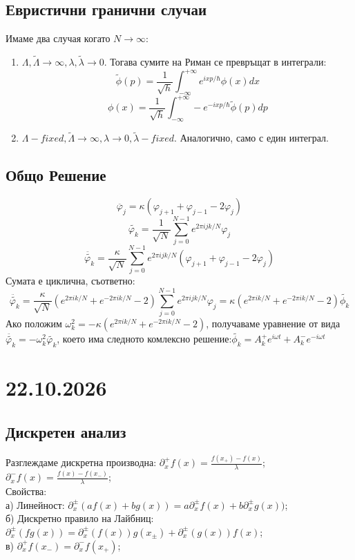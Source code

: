 \documentclass[12pt, a4paper]{article}
\begin{document}
\subsection*{Евристични гранични случаи}
Имаме два случая когато $N\rightarrow\infty$:\\
\begin{enumerate}
	\item $\Lambda, \tilde{\Lambda} \rightarrow \infty, \lambda, \tilde{\lambda} \rightarrow 0.$ Тогава сумите на Риман се превръщат в интеграли:\\
	\[\tilde{\phi}(p)=\frac{1}{\sqrt{h}}\int_{-\infty}^{+\infty}e^{ixp/\hbar}\phi(x)dx\]
	\[\phi(x)=\frac{1}{\sqrt{h}}\int_{-\infty}^{+\infty}-e^{-ixp/\hbar}\tilde{\phi}(p)dp\]
	\item $\Lambda-fixed, \tilde{\Lambda} \rightarrow \infty, \lambda \rightarrow 0, \tilde{\lambda} - fixed.$ Аналогично, само с един интеграл.
\end{enumerate}

\subsection*{Общо Решение}
\[\ddot{\varphi_j}=\kappa(\varphi_{j+1}+\varphi_{j-1}-2\varphi_{j})\]
\[\tilde{\varphi_k}=\frac{1}{\sqrt{N}}\sum_{j=0}^{N-1}e^{2\pi ijk/N}\varphi_j\]
\[\ddot{\tilde{\varphi_k}}=\frac{\kappa}{\sqrt{N}}\sum_{j=0}^{N-1}e^{2\pi ijk/N}(\varphi_{j+1}+\varphi_{j-1}-2\varphi_{j})\]
Сумата е циклична, съответно:
\[\ddot{\tilde{\varphi_k}}=\frac{\kappa}{\sqrt{N}}(e^{2\pi ik/N}+e^{-2\pi ik/N}-2)\sum_{j=0}^{N-1}e^{2\pi ijk/N}\varphi_{j}=\kappa(e^{2\pi ik/N}+e^{-2\pi ik/N}-2)\tilde{\phi_k}\]
Ако положим $\omega_k^2=-\kappa(e^{2\pi ik/N}+e^{-2\pi ik/N}-2)$, получаваме уравнение от вида $\ddot{\tilde{\varphi_k}}=-\omega_k^2\tilde{\varphi_k}$, което има следното комлексно решение:$\tilde{\phi_k}=A_k^+e^{i\omega t}+A_k^-e^{-i\omega t}$

{\centering\section*{22.10.2026}}
\subsection*{Дискретен анализ}
Разглеждаме дискретна производна: $\partial^+_x f(x)=\frac{f(x_+)-f(x)}{\lambda}$; $\partial^-_x f(x)=\frac{f(x)-f(x_-)}{\lambda}$;\\
Свойства:\\
\indent а) Линейност: $\partial^\pm_x(af(x)+bg(x))=a\partial^\pm_xf(x)+b\partial^\pm_xg(x))$;\\
\indent б) Дискретно правило на Лайбниц: $\partial^\pm_x(fg(x))=\partial^\pm_x(f(x))g(x_\pm)+\partial^\pm_x(g(x))f(x)$;\\
\indent в) $\partial^+_xf(x_-)=\partial^-_xf(x_+)$;\\
\end{document}
